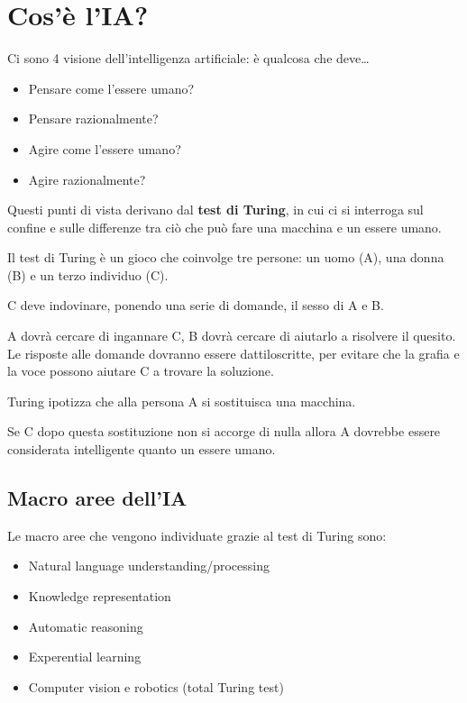 \newpage

\section{Cos'è l'IA?}

Ci sono 4 visione dell'intelligenza artificiale: è qualcosa che deve\dots

\begin{itemize}
 \item Pensare come l'essere umano?
 \item Pensare razionalmente?
 \item Agire come l'essere umano?
 \item Agire razionalmente?
\end{itemize}

Questi punti di vista derivano dal \textbf{test di Turing}, in cui ci si
interroga sul confine e sulle differenze tra ciò che può fare una macchina
e un essere umano.

Il test di Turing è un gioco che coinvolge tre persone: un uomo (A), una
donna (B) e un terzo individuo (C).

C deve indovinare, ponendo una serie di domande, il sesso di A e B.

A dovrà cercare di ingannare C, B dovrà cercare di aiutarlo a risolvere il
quesito. Le risposte alle domande dovranno essere dattiloscritte, per evitare
che la grafia e la voce possono aiutare C a trovare la soluzione.

Turing ipotizza che alla persona A si sostituisca una macchina.

Se C dopo questa sostituzione non si accorge di nulla allora A dovrebbe
essere considerata intelligente quanto un essere umano.

\subsection{Macro aree dell'IA}

Le macro aree che vengono individuate grazie al test di Turing sono:

\begin{itemize}
 \item Natural language understanding/processing
 \item Knowledge representation
 \item Automatic reasoning
 \item Experential learning
 \item Computer vision e robotics (total Turing test)
\end{itemize}


